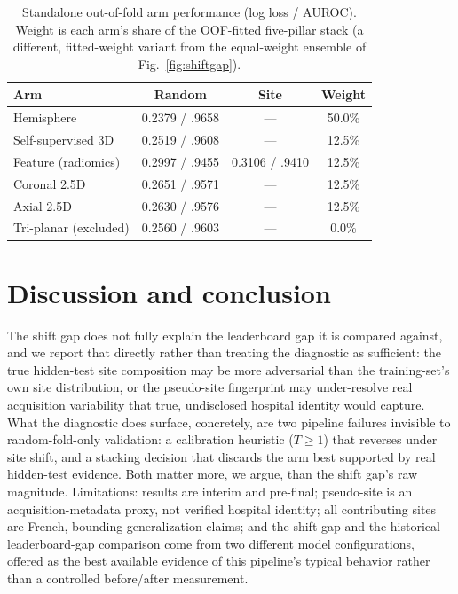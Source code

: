 \documentclass{article}
\begin{document}
\begin{table}[t]
\centering
\small
\caption{Standalone out-of-fold arm performance (log loss / AUROC). Weight is each arm's share of the OOF-fitted five-pillar stack (a different, fitted-weight variant from the equal-weight ensemble of Fig.~\ref{fig:shiftgap}).}
\label{tab:arms}
\begin{tabular}{@{}lccc@{}}
\toprule
\textbf{Arm} & \textbf{Random} & \textbf{Site} & \textbf{Weight} \\
\midrule
Hemisphere & 0.2379 / .9658 & --- & 50.0\% \\
Self-supervised 3D & 0.2519 / .9608 & --- & 12.5\% \\
Feature (radiomics) & 0.2997 / .9455 & 0.3106 / .9410 & 12.5\% \\
Coronal 2.5D & 0.2651 / .9571 & --- & 12.5\% \\
Axial 2.5D & 0.2630 / .9576 & --- & 12.5\% \\
Tri-planar (excluded) & 0.2560 / .9603 & --- & 0.0\% \\
\bottomrule
\end{tabular}
\end{table}

\section{Discussion and conclusion}
\label{sec:discussion}

The shift gap does not fully explain the leaderboard gap it is compared against, and we report that directly rather than treating the diagnostic as sufficient: the true hidden-test site composition may be more adversarial than the training-set's own site distribution, or the pseudo-site fingerprint may under-resolve real acquisition variability that true, undisclosed hospital identity would capture. What the diagnostic does surface, concretely, are two pipeline failures invisible to random-fold-only validation: a calibration heuristic ($T\geq1$) that reverses under site shift, and a stacking decision that discards the arm best supported by real hidden-test evidence. Both matter more, we argue, than the shift gap's raw magnitude. Limitations: results are interim and pre-final; pseudo-site is an acquisition-metadata proxy, not verified hospital identity; all contributing sites are French, bounding generalization claims; and the shift gap and the historical leaderboard-gap comparison come from two different model configurations, offered as the best available evidence of this pipeline's typical behavior rather than a controlled before/after measurement.
\end{document}
